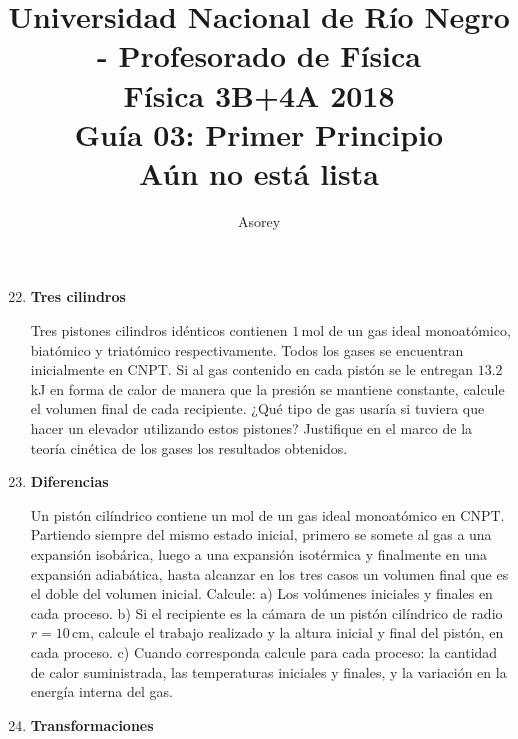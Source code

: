 \documentclass[a4paper,12pt]{article}
\begin{document}
\title{
{\normalsize{Universidad Nacional de Río Negro - Profesorado de Física}}\\
Física 3B+4A  2018 \\ Guía 03: Primer Principio \\ {\bf{Aún no está lista}}
}
\author{Asorey}
\maketitle

\begin{enumerate}
	\setcounter{enumi}{21}      %

    \item {\bf{Tres cilindros}}

        Tres pistones cilindros idénticos contienen $1$\,mol de un gas ideal 
        monoatómico, biatómico y triatómico respectivamente. Todos los gases se
        encuentran inicialmente en CNPT. Si al gas contenido en cada pistón se
        le entregan $13.2$\,kJ en forma de calor de manera que la presión se
        mantiene constante, calcule el volumen final de cada recipiente.
        ¿Qué tipo de gas usaría si tuviera que hacer un elevador utilizando 
        estos pistones? Justifique en el marco de la teoría cinética de los
        gases los resultados obtenidos.

	\item {\bf{Diferencias}}
		
		Un pistón cilíndrico contiene un mol de un gas ideal monoatómico en
		CNPT.  Partiendo siempre del mismo estado inicial, primero se somete al
		gas a una expansión isobárica, luego a una expansión isotérmica y
		finalmente en una expansión adiabática, hasta alcanzar en los tres
		casos un volumen final que es el doble del volumen inicial. Calcule: a)
		Los volúmenes iniciales y finales en cada proceso. b) Si el recipiente
		es la cámara de un pistón cilíndrico de radio $r=10$\,cm, calcule el
		trabajo realizado y la altura inicial y final del pistón, en cada
		proceso. c) Cuando corresponda calcule para cada proceso: la cantidad
		de calor suministrada, las temperaturas iniciales y finales, y la
		variación en la energía interna del gas.
	
	\item {\bf{Transformaciones}}
		

\end{enumerate}
\end{document}
